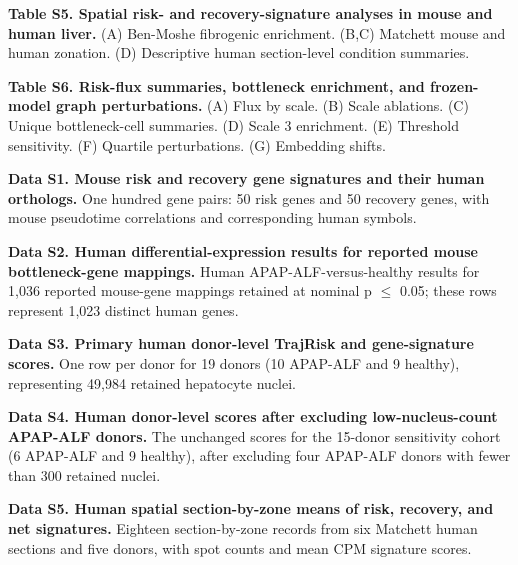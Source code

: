 \noindent\textbf{Table S5. Spatial risk- and recovery-signature analyses in mouse and human liver.} (A) Ben-Moshe fibrogenic enrichment. (B,C) Matchett mouse and human zonation. (D) Descriptive human section-level condition summaries.\par\medskip
{}
\noindent\textbf{Table S6. Risk-flux summaries, bottleneck enrichment, and frozen-model graph perturbations.} (A) Flux by scale. (B) Scale ablations. (C) Unique bottleneck-cell summaries. (D) Scale 3 enrichment. (E) Threshold sensitivity. (F) Quartile perturbations. (G) Embedding shifts.\par\medskip

\Needspace{58pt}
\noindent\textbf{Data S1. Mouse risk and recovery gene signatures and their human orthologs.} One hundred gene pairs: 50 risk genes and 50 recovery genes, with mouse pseudotime correlations and corresponding human symbols.\par\medskip

\Needspace{58pt}
\noindent\textbf{Data S2. Human differential-expression results for reported mouse bottleneck-gene mappings.} Human APAP-ALF-versus-healthy results for 1,036 reported mouse-gene mappings retained at nominal p \(\leq\) 0.05; these rows represent 1,023 distinct human genes.\par\medskip

\Needspace{58pt}
\noindent\textbf{Data S3. Primary human donor-level TrajRisk and gene-signature scores.} One row per donor for 19 donors (10 APAP-ALF and 9 healthy), representing 49,984 retained hepatocyte nuclei.\par\medskip

\Needspace{58pt}
\noindent\textbf{Data S4. Human donor-level scores after excluding low-nucleus-count APAP-ALF donors.} The unchanged scores for the 15-donor sensitivity cohort (6 APAP-ALF and 9 healthy), after excluding four APAP-ALF donors with fewer than 300 retained nuclei.\par\medskip

\Needspace{58pt}
\noindent\textbf{Data S5. Human spatial section-by-zone means of risk, recovery, and net signatures.} Eighteen section-by-zone records from six Matchett human sections and five donors, with spot counts and mean CPM signature scores.\par\medskip
